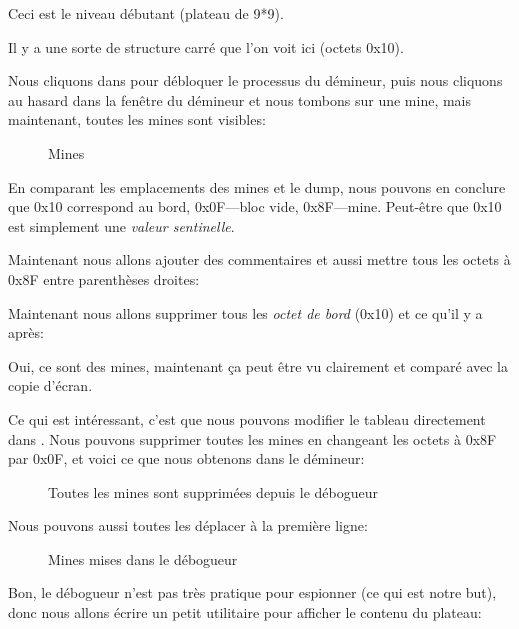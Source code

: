 Ceci est le niveau débutant (plateau de 9*9).

Il y a une sorte de structure carré que l'on voit ici (octets 0x10).

Nous cliquons  dans \olly pour débloquer le processus du démineur, puis nous
cliquons au hasard dans la fenêtre du démineur et nous tombons sur une mine, mais
maintenant, toutes les mines sont visibles:

\begin{figure}[H]
\centering
{}
\caption{Mines}
\label{fig:minesweeper1}
\end{figure}

En comparant les emplacements des mines et le dump, nous pouvons en conclure que
0x10 correspond au bord, 0x0F---bloc vide, 0x8F---mine.
Peut-être que 0x10 est simplement une \emph{valeur sentinelle}.

Maintenant nous allons ajouter des commentaires et aussi mettre tous les octets à
0x8F entre parenthèses droites:



Maintenant nous allons supprimer tous les \emph{octet de bord} (0x10) et ce qu'il
y a après:



Oui, ce sont des mines, maintenant ça peut être vu clairement et comparé avec la
copie d'écran.

\clearpage
Ce qui est intéressant, c'est que nous pouvons modifier le tableau directement dans
\olly.
Nous pouvons supprimer toutes les mines en changeant les octets à 0x8F par 0x0F,
et voici ce que nous obtenons dans le démineur:

\begin{figure}[H]
\centering
{}
\caption{Toutes les mines sont supprimées depuis le débogueur}
\label{fig:minesweeper3}
\end{figure}

Nous pouvons aussi toutes les déplacer à la première ligne:

\begin{figure}[H]
\centering
{}
\caption{Mines mises dans le débogueur}
\label{fig:minesweeper2}
\end{figure}

Bon, le débogueur n'est pas très pratique pour espionner (ce qui est notre but),
donc nous allons écrire un petit utilitaire pour afficher le contenu du plateau:

